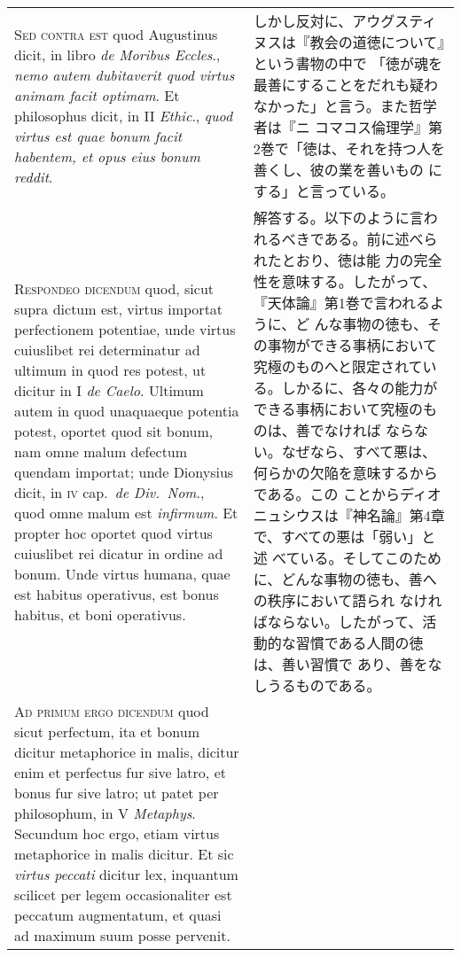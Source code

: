 \documentclass[10pt]{jsarticle}
\begin{document}
\begin{longtable}{p{21em}p{21em}}
{\scshape Sed contra est} quod Augustinus dicit, in libro {\itshape de
Moribus Eccles}., {\itshape nemo autem dubitaverit quod virtus animam
facit optimam}. Et philosophus dicit, in II {\itshape Ethic}.,
{\itshape quod virtus est quae bonum facit habentem, et opus eius
bonum reddit}.

&

しかし反対に、アウグスティヌスは『教会の道徳について』という書物の中で
「徳が魂を最善にすることをだれも疑わなかった」と言う。また哲学者は『ニ
コマコス倫理学』第2巻で「徳は、それを持つ人を善くし、彼の業を善いもの
にする」と言っている。

\\



{\scshape Respondeo dicendum} quod, sicut supra dictum est, virtus
importat perfectionem potentiae, unde virtus cuiuslibet rei
determinatur ad ultimum in quod res potest, ut dicitur in I {\itshape
de Caelo}. Ultimum autem in quod unaquaeque potentia potest, oportet
quod sit bonum, nam omne malum defectum quendam importat; unde
Dionysius dicit, in {\scshape iv} cap.~{\itshape de Div.~Nom}., quod
omne malum est {\itshape infirmum}. Et propter hoc oportet quod virtus
cuiuslibet rei dicatur in ordine ad bonum. Unde virtus humana, quae
est habitus operativus, est bonus habitus, et boni operativus.

&

解答する。以下のように言われるべきである。前に述べられたとおり、徳は能
力の完全性を意味する。したがって、『天体論』第1巻で言われるように、ど
んな事物の徳も、その事物ができる事柄において究極のものへと限定されてい
る。しかるに、各々の能力ができる事柄において究極のものは、善でなければ
ならない。なぜなら、すべて悪は、何らかの欠陥を意味するからである。この
ことからディオニュシウスは『神名論』第4章で、すべての悪は「弱い」と述
べている。そしてこのために、どんな事物の徳も、善への秩序において語られ
なければならない。したがって、活動的な習慣である人間の徳は、善い習慣で
あり、善をなしうるものである。

\\



{\scshape Ad primum ergo dicendum} quod sicut perfectum, ita et bonum
dicitur metaphorice in malis, dicitur enim et perfectus fur sive
latro, et bonus fur sive latro; ut patet per philosophum, in V
{\itshape Metaphys}. Secundum hoc ergo, etiam virtus metaphorice in
malis dicitur. Et sic {\itshape virtus peccati} dicitur lex, inquantum
scilicet per legem occasionaliter est peccatum augmentatum, et quasi
ad maximum suum posse pervenit.


\end{longtable}
\end{document}
